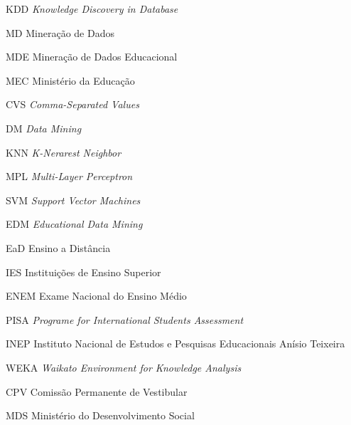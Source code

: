 \documentclass[
	12pt,				%
    oneside,			%
	a4paper,			%
	chapter=TITLE,		%
	english,			%
	brazil				%
	]{abntex2}
\begin{document}
\begin{siglas}
  \item[KDD] \textit{Knowledge Discovery in Database}
  \item[MD] Mineração de Dados
  \item[MDE] Mineração de Dados Educacional
  \item[MEC] Ministério da Educação
  \item[CVS] \textit{Comma-Separated Values}
  \item[DM] \textit{Data Mining}
  \item[KNN] \textit{K-Nerarest Neighbor}
  \item[MPL] \textit{Multi-Layer Perceptron}
  \item[SVM] \textit{Support Vector Machines}
  \item[EDM] \textit{Educational Data Mining}
  \item[EaD] Ensino a Distância
  \item[IES] Instituições de Ensino Superior
  \item[ENEM] Exame Nacional do Ensino Médio
  \item[PISA] \textit{Programe for International Students Assessment}
  \item[INEP] Instituto Nacional de Estudos e Pesquisas Educacionais Anísio Teixeira
  \item[WEKA] \textit{Waikato Environment for Knowledge Analysis}
  \item[CPV] Comissão Permanente de Vestibular
  \item[MDS] Ministério do Desenvolvimento Social     
\end{siglas}


\tableofcontents*
\cleardoublepage



\textual
\end{document}
